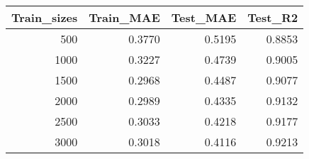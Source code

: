 \begin{tabular}{rrrr}
\toprule
Train_sizes & Train_MAE & Test_MAE & Test_R2 \\
\midrule
500 & 0.3770 & 0.5195 & 0.8853 \\
1000 & 0.3227 & 0.4739 & 0.9005 \\
1500 & 0.2968 & 0.4487 & 0.9077 \\
2000 & 0.2989 & 0.4335 & 0.9132 \\
2500 & 0.3033 & 0.4218 & 0.9177 \\
3000 & 0.3018 & 0.4116 & 0.9213 \\
\bottomrule
\end{tabular}
